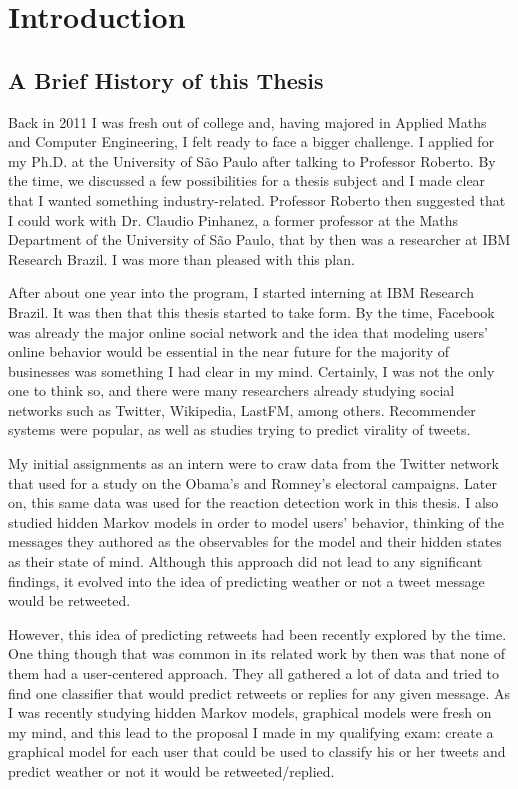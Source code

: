 \chapter{Introduction}

\section{A Brief History of this Thesis}

Back in 2011 I was fresh out of college and, having majored in Applied Maths and Computer Engineering, I felt ready to face a bigger challenge. I applied for my Ph.D. at the University of São Paulo after talking to Professor Roberto. By the time, we discussed a few possibilities for a thesis subject and I made clear that I wanted something industry-related. Professor Roberto then suggested that I could work with Dr. Claudio Pinhanez, a former professor at the Maths Department of the University of São Paulo, that by then was a researcher at IBM Research Brazil. I was more than pleased with this plan.

After about one year into the program, I started interning at IBM Research Brazil. It was then that this thesis started to take form. By the time, Facebook was already the major online social network and the idea that modeling users' online behavior would be essential in the near future for the majority of businesses was something I had clear in my mind. Certainly, I was not the only one to think so, and there were many researchers already studying social networks such as Twitter, Wikipedia, LastFM, among others. Recommender systems were popular, as well as studies trying to predict virality of tweets. 

My initial assignments as an intern were to craw data from the Twitter network that used for a study on the Obama's and Romney's electoral campaigns. Later on, this same data was used for the reaction detection work in this thesis. I also studied hidden Markov models in order to model users' behavior, thinking of the messages they authored as the observables for the model and their hidden states as their state of mind. Although this approach did not lead to any significant findings, it evolved into the idea of predicting weather or not a tweet message would be retweeted.

However, this idea of predicting retweets had been recently explored by the time. One thing though that was common in its related work by then was that none of them had a user-centered approach. They all gathered a lot of data and tried to find one classifier that would predict retweets or replies for any given message. As I was recently studying hidden Markov models, graphical models were fresh on my mind, and this lead to the proposal I made in my qualifying exam: create a graphical model for each user that could be used to classify his or her tweets and predict weather or not it would be retweeted/replied. 

